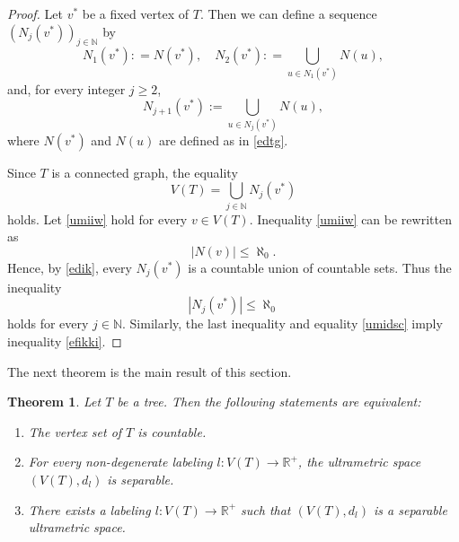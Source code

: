 \documentclass[pdflatex,sn-mathphys-num]{sn-jnl}%
\newtheorem{theorem}{Theorem}%
\theoremstyle{thmstyletwo}%
\begin{document}
\begin{proof} 

Let $v^*$ be a fixed vertex of $T$. Then we can define a sequence $(N_j(v^*))_{j \in \mathbb{N}}$ by
\begin{equation*}
N_1(v^*): = N(v^*), \quad N_2(v^*): = \bigcup_{u \in N_1(v^*)} N(u),
\end{equation*}
and, for every integer $j \geq 2$,
\begin{equation}
\label{edik}
N_{j+1}(v^*) := \bigcup_{u \in N_j(v^*)} N(u),
\end{equation}
where $N(v^*)$ and $N(u)$ are defined as in \eqref{edtg}.





Since $T$ is a connected graph, the equality 
\begin{equation}
\label{umidsc}
V(T) = \bigcup_{j \in \mathbb{N}} N_j(v^*)
\end{equation}
holds.
Let \eqref{umiiw} hold for every $v \in V(T)$. Inequality \eqref{umiiw} can be rewritten as
\begin{equation*}
|N(v)| \leq \aleph_0. 
\end{equation*} Hence, by \eqref{edik}, every $N_j(v^*)$ is a countable union of countable sets. Thus the inequality
\begin{equation*}
|N_j(v^*)| \leq \aleph_0
\end{equation*}
holds for every $j \in \mathbb{N}$.
Similarly, the last inequality and equality \eqref{umidsc} imply inequality \eqref{efikki}.

\end{proof}




The next theorem is the main result of this section.

\begin{theorem}\label{ggewj77}
Let $T$ be a tree. Then the following statements are equivalent:
\begin{enumerate}[label=\textit{(\roman*)}, left=0pt]
    \item The vertex set of $T$ is  countable.

   \item For every non-degenerate labeling $l \colon V(T) \to \mathbb{R}^+$, the ultrametric space $(V(T), d_l)$ is separable.
    
    \item There exists a labeling $l \colon V(T) \to \mathbb{R}^+$ such that $(V(T), d_l)$ is a separable ultrametric space.
    
 
\end{enumerate}
\end{theorem}
\end{document}
